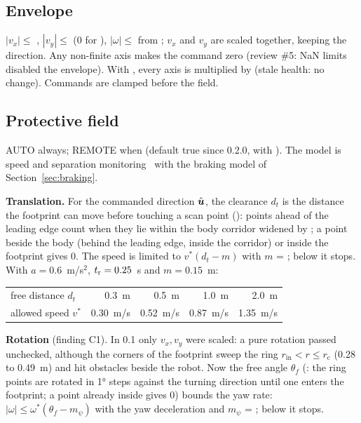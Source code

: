 \subsection{Envelope}

$|v_x| \le$ , $|v_y| \le$  (0 for ), $|\omega| \le$
 from ; $v_x$ and $v_y$ are scaled together, keeping the
direction. Any non-finite axis makes the command zero (review \#5: NaN limits disabled the
envelope). With , every axis is multiplied by 
(stale health: no change). Commands are clamped before the field.

\subsection{Protective field}

AUTO always; REMOTE when  (default true since 0.2.0, with
). The model is speed and separation
monitoring~\cite{isots15066,marvel2016ssm} with the braking model of
Section~\ref{sec:braking}.

\textbf{Translation.} For the commanded direction $\hat{\boldsymbol{u}}$, the clearance $d_t$ is the
distance the footprint can move before touching a scan point
(): points ahead of the leading edge count when they lie within the
body corridor widened by ; a point beside the body (behind the
leading edge, inside the corridor) or inside the footprint gives 0. The speed is limited to
$v^*(d_t - m)$ with $m$ = ; below  it stops. With
$a = 0.6$~m/s$^2$, $t_{\mathrm{r}} = 0.25$~s and $m = 0.15$~m:
\begin{center}
\begin{tabular}{@{}lrrrr@{}}
  \toprule
  free distance $d_t$ & 0.3~m & 0.5~m & 1.0~m & 2.0~m \\
  allowed speed $v^*$ & 0.30~m/s & 0.52~m/s & 0.87~m/s & 1.35~m/s \\
  \bottomrule
\end{tabular}
\end{center}

\textbf{Rotation} (finding C1). In 0.1 only $v_x, v_y$ were scaled: a pure rotation passed
unchecked, although the corners of the footprint sweep the ring $r_{\mathrm{in}} < r \le
r_{\mathrm{c}}$ (0.28 to 0.49~m) and hit obstacles beside the robot. Now the free angle
$\theta_f$ (: the ring points are rotated in 1° steps against the turning
direction until one enters the footprint; a point already inside gives 0) bounds the yaw rate:
$|\omega| \le \omega^*(\theta_f - m_\psi)$ with the yaw deceleration  and
$m_\psi$ = ; below  it stops.

